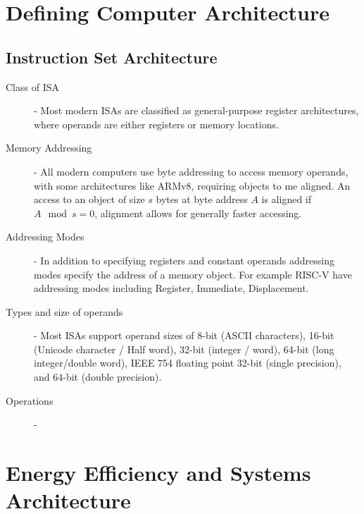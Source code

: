 \documentclass[12pt letter]{report}
\begin{document}
\chapter{Defining Computer Architecture}

\section{Instruction Set Architecture}


\begin{description}
  \item[Class of ISA] - Most modern ISAs are classified as general-purpose register architectures, where operands are
        either registers or memory locations.
  \item[Memory Addressing]- All modern computers use byte addressing to access memory operands, with some architectures
        like ARMv8, requiring objects to me aligned. An access to an object of size $s$ bytes at byte address $A$ is aligned
        if $A \mod s = 0$, alignment allows for generally faster accessing.
  \item[Addressing Modes] - In addition to specifying registers and constant operands addressing modes specify the
        address of a memory object. For example RISC-V have addressing modes including Register, Immediate,
        Displacement.
  \item[Types and size of operands]- Most ISAs support operand sizes of 8-bit (ASCII characters), 16-bit (Unicode
        character / Half word), 32-bit (integer / word), 64-bit (long integer/double word), IEEE 754 floating point
        32-bit (single precision), and 64-bit (double precision).
  \item[Operations] -
\end{description}

\chapter{Energy Efficiency and Systems Architecture}

\end{document}
